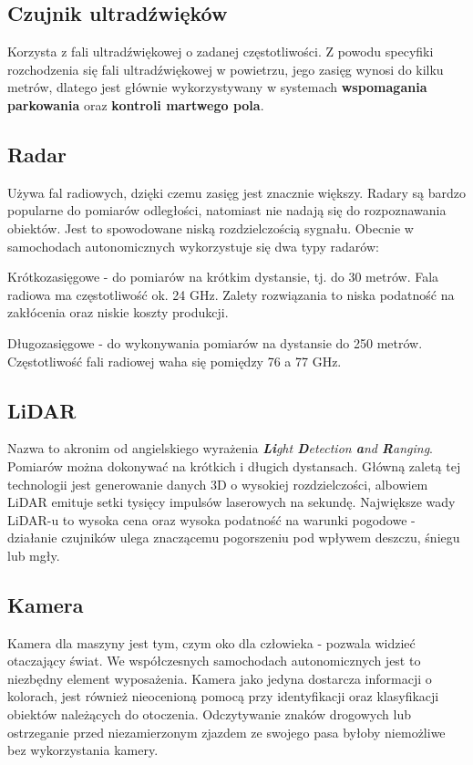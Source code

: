\subsection{Czujnik ultradźwięków}
Korzysta z fali ultradźwiękowej o zadanej częstotliwości. Z powodu specyfiki rozchodzenia się fali ultradźwiękowej w powietrzu, jego zasięg wynosi do kilku metrów, dlatego jest głównie wykorzystywany w systemach \textbf{wspomagania parkowania} oraz \textbf{kontroli martwego pola}.

\subsection{Radar}
Używa fal radiowych, dzięki czemu zasięg jest znacznie większy. Radary są bardzo popularne do pomiarów odległości, natomiast nie nadają się do rozpoznawania obiektów. Jest to spowodowane niską rozdzielczością sygnału. Obecnie w samochodach autonomicznych wykorzystuje się dwa typy radarów:
\begin{enumerate*}
\vspace{-0.5cm}
\item Krótkozasięgowe - do pomiarów na krótkim dystansie, tj. do 30 metrów. Fala radiowa ma częstotliwość ok. 24 GHz. Zalety rozwiązania to niska podatność na zakłócenia oraz niskie koszty produkcji.
\item Długozasięgowe - do wykonywania pomiarów na dystansie do 250 metrów. Częstotliwość fali radiowej waha się pomiędzy 76 a 77 GHz. 
\end{enumerate*}

\subsection{LiDAR}
Nazwa to akronim od angielskiego wyrażenia \textit{\textbf{Li}ght \textbf{D}etection \textbf{a}nd \textbf{R}anging}. Pomiarów można dokonywać na krótkich i długich dystansach. Główną zaletą tej technologii jest generowanie danych 3D o wysokiej rozdzielczości, albowiem LiDAR emituje setki tysięcy impulsów laserowych na sekundę. Największe wady LiDAR-u to wysoka cena oraz wysoka podatność na warunki pogodowe - działanie czujników ulega znaczącemu pogorszeniu pod wpływem deszczu, śniegu lub mgły.

\subsection{Kamera}
Kamera dla maszyny jest tym, czym oko dla człowieka - pozwala widzieć otaczający świat. We współczesnych samochodach autonomicznych jest to niezbędny element wyposażenia. Kamera jako jedyna dostarcza informacji o kolorach, jest również nieocenioną pomocą przy identyfikacji oraz klasyfikacji obiektów należących do otoczenia. Odczytywanie znaków drogowych lub ostrzeganie przed niezamierzonym zjazdem ze swojego pasa byłoby niemożliwe bez wykorzystania kamery.

